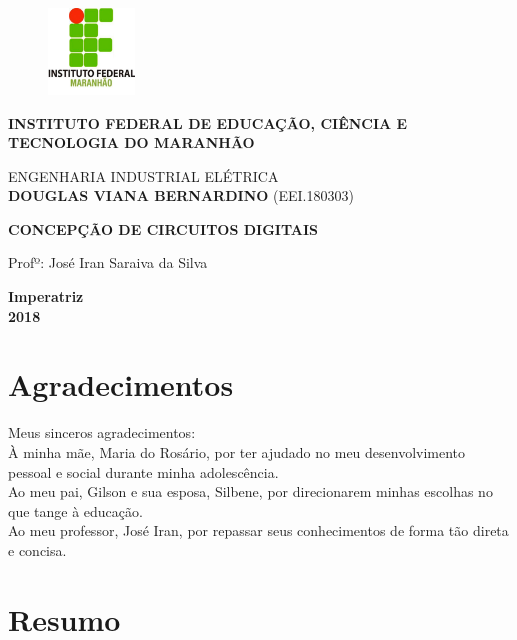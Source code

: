 \documentclass[12pt,a4paper]{article}
\begin{document}
\thispagestyle{empty}
\begin{figure}\centering
\includegraphics[width=2.3cm,height=2.3cm]{if.jpg}
\end{figure}
\begin{center}\textbf{\large{INSTITUTO FEDERAL DE EDUCAÇÃO, CIÊNCIA E TECNOLOGIA DO MARANHÃO}}\end{center}
\vspace{3cm}

\begin{center}ENGENHARIA INDUSTRIAL ELÉTRICA\vspace{1.5cm}\\\textbf{DOUGLAS VIANA BERNARDINO} (EEI.180303)\end{center}
\vspace{3cm}

\begin{center}\textbf{CONCEPÇÃO DE CIRCUITOS DIGITAIS}\end{center}
\vspace{1.7cm}

Profº: José Iran Saraiva da Silva
\vfill \begin{center}\textbf{Imperatriz \\ 2018}\end{center}

\newpage %

\thispagestyle{empty}
\section*{Agradecimentos}
Meus sinceros agradecimentos:\\
\indent À  minha mãe, Maria do Rosário,  por ter ajudado no meu desenvolvimento pessoal e social durante minha adolescência.\\
\indent Ao meu pai, Gilson e sua esposa, Silbene,  por direcionarem minhas escolhas no que tange à educação.\\
\indent Ao meu professor, José Iran, por repassar seus conhecimentos de forma tão direta e concisa.

\newpage %

\section*{Resumo}
\end{document}
